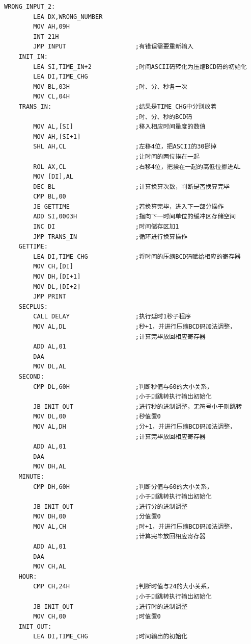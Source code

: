 \documentclass[11pt]{SEU-Digital-Report}
\begin{document}
\begin{lstlisting}[language={[x86masm]Assembler},title=CLK]
    WRONG_INPUT_2:
        LEA DX,WRONG_NUMBER
        MOV AH,09H
        INT 21H
        JMP INPUT                   ;有错误需要重新输入
    INIT_IN:
        LEA SI,TIME_IN+2            ;时间ASCII码转化为压缩BCD码的初始化
        LEA DI,TIME_CHG
        MOV BL,03H                  ;时、分、秒各一次
        MOV CL,04H
    TRANS_IN:                       ;结果是TIME_CHG中分别放着
                                    ;时、分、秒的BCD码
        MOV AL,[SI]		            ;移入相应时间量度的数值
        MOV AH,[SI+1]
        SHL AH,CL                   ;左移4位，把ASCII的30挪掉
                                    ;让时间的两位挨在一起
        ROL AX,CL                   ;右移4位，把挨在一起的高低位挪进AL
        MOV [DI],AL
        DEC BL                      ;计算换算次数，判断是否换算完毕
        CMP BL,00
        JE GETTIME                  ;若换算完毕，进入下一部分操作
        ADD SI,0003H                ;指向下一时间单位的缓冲区存储空间
        INC DI                      ;时间储存区加1
        JMP TRANS_IN                ;循环进行换算操作
    GETTIME:
        LEA DI,TIME_CHG             ;将时间的压缩BCD码赋给相应的寄存器
        MOV CH,[DI]
        MOV DH,[DI+1]
        MOV DL,[DI+2]
        JMP PRINT
    SECPLUS:
        CALL DELAY                  ;执行延时1秒子程序
        MOV AL,DL                   ;秒+1，并进行压缩BCD码加法调整，
                                    ;计算完毕放回相应寄存器
        ADD AL,01
        DAA
        MOV DL,AL
    SECOND:
        CMP DL,60H                  ;判断秒值与60的大小关系，
                                    ;小于则跳转执行输出初始化
        JB INIT_OUT                 ;进行秒的进制调整，无符号小于则跳转
        MOV DL,00                   ;秒值置0
        MOV AL,DH                   ;分+1，并进行压缩BCD码加法调整，
                                    ;计算完毕放回相应寄存器
        ADD AL,01
        DAA
        MOV DH,AL
    MINUTE:
        CMP DH,60H                  ;判断分值与60的大小关系，
                                    ;小于则跳转执行输出初始化
        JB INIT_OUT                 ;进行分的进制调整
        MOV DH,00                   ;分值置0
        MOV AL,CH                   ;时+1，并进行压缩BCD码加法调整，
                                    ;计算完毕放回相应寄存器
        ADD AL,01
        DAA
        MOV CH,AL
    HOUR:
        CMP CH,24H                  ;判断时值与24的大小关系，
                                    ;小于则跳转执行输出初始化
        JB INIT_OUT                 ;进行时的进制调整
        MOV CH,00                   ;时值置0
    INIT_OUT:
        LEA DI,TIME_CHG             ;时间输出的初始化

\end{lstlisting}
\end{document}
